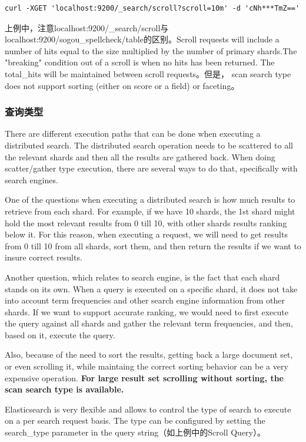 \begin{verbatim}
curl -XGET 'localhost:9200/_search/scroll?scroll=10m' -d 'cNh***TmZ=='
\end{verbatim}
\par 上例中，注意localhost:9200/\_search/scroll与localhost:9200/sogou\_spellcheck/table的区别。Scroll requests will include a number of hits equal to the size multiplied by the number of primary shards.The "breaking" condition out of a scroll is when no hits has been returned. The total\_hits will be maintained between scroll requests。但是， scan search type does not support sorting (either on score or a field) or faceting。
\subsubsection{查询类型}
\par There are different execution paths that can be done when executing a distributed search. The distributed search operation needs to be scattered to all the relevant shards and then all the results are gathered back. When doing scatter/gather type execution, there are several ways to do that, specifically with search engines.
\par One of the questions when executing a distributed search is how much results to retrieve from each shard. For example, if we have 10 shards, the 1st shard might hold the most relevant results from 0 till 10, with other shards results ranking below it. For this reason, when executing a request, we will need to get results from 0 till 10 from all shards, sort them, and then return the results if we want to insure correct results.
\par Another question, which relates to search engine, is the fact that each shard stands on its own. When a query is executed on a specific shard, it does not take into account term frequencies and other search engine information from other shards. If we want to support accurate ranking, we would need to first execute the query against all shards and gather the relevant term frequencies, and then, based on it, execute the query.
\par Also, because of the need to sort the results, getting back a large document set, or even scrolling it, while maintaing the correct sorting behavior can be a very expensive operation. \textbf{For large result set scrolling without sorting, the scan search type is available.}
\par Elasticsearch is very flexible and allows to control the type of search to execute on a per search request basis. The type can be configured by setting the search\_type parameter in the query string（如上例中的Scroll Query）。
